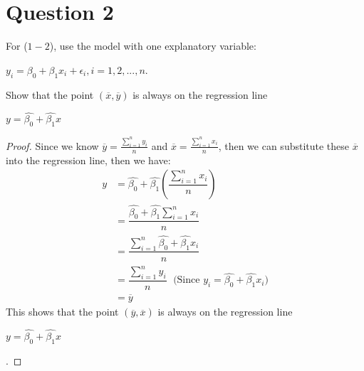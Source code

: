 \section{Question 2}

\begin{question}
    For ($1-2$), use the model with one explanatory variable:
    \begin{center}
        $y_i = \beta_0 + \beta_1x_i + \epsilon_i, i = 1,2,...,n$.
    \end{center}
    Show that the point $(\overline{x},\overline{y})$ is always on the regression line
    \begin{center}
        $y = \hat{\beta_0} + \hat{\beta_1}x$
    \end{center}
\end{question}

\begin{answer}
    \begin{proof}
        Since we know $\overline{y} = \tfrac{\sum_{i = 1}^{n}{y_i}}{n}$ and $\overline{x} = \tfrac{\sum_{i = 1}^{n}{x_i}}{n}$, then we can substitute these $\overline{x}$ into the regression line, then we have:
        \begin{align}
            y &= \hat{\beta_0} + \hat{\beta_1}\left(\dfrac{\sum_{i = 1}^{n}{x_i}}{n}\right)\\
            & = \dfrac{\hat{\beta_0} + \hat{\beta_1}\sum_{i = 1}^{n}{x_i}}{n}\\
            & = \dfrac{\sum_{i = 1}^{n}{\hat{\beta_0} + \hat{\beta_1}x_i}}{n}\\
            & = \dfrac{\sum_{i = 1}^{n}{y_i}}{n}\; \text{  (Since } y_i = \hat{\beta_0} + \hat{\beta_1}x_i \text{)}\\
            & = \overline{y}
        \end{align}
        This shows that the point $(\overline{y},\overline{x})$ is always on the regression line 
        \begin{center}
            $y = \hat{\beta_0} + \hat{\beta_1}x$
        \end{center}. 
    \end{proof}
\end{answer}
